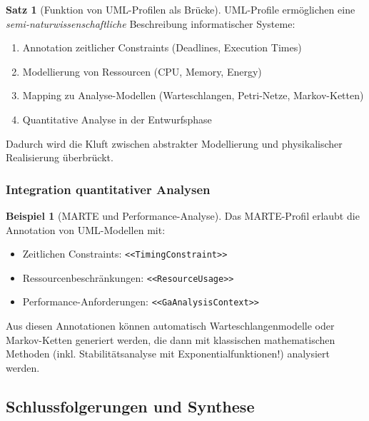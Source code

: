 ﻿\documentclass[a4paper,12pt]{scrreprt}
\theoremstyle{definition}
\newtheorem{beispiel}{Beispiel}[section]
\newtheorem{satz}{Satz}[section]
\begin{document}
\begin{satz}[Funktion von UML-Profilen als Brücke]
	UML-Profile ermöglichen eine \textit{semi-naturwissenschaftliche} Beschreibung informatischer Systeme:
	\begin{enumerate}
		\item[-] Annotation zeitlicher Constraints (Deadlines, Execution Times)
		\item[-] Modellierung von Ressourcen (CPU, Memory, Energy)
		\item[-] Mapping zu Analyse-Modellen (Warteschlangen, Petri-Netze, Markov-Ketten)
		\item[-] Quantitative Analyse in der Entwurfsphase
	\end{enumerate}
	
	Dadurch wird die Kluft zwischen abstrakter Modellierung und physikalischer Realisierung überbrückt.
\end{satz}

\subsubsection{Integration quantitativer Analysen}

\begin{beispiel}[MARTE und Performance-Analyse]
	Das MARTE-Profil erlaubt die Annotation von UML-Modellen mit:
	\begin{itemize}
		\item[-] Zeitlichen Constraints: \texttt{<<TimingConstraint>>}
		\item[-] Ressourcenbeschränkungen: \texttt{<<ResourceUsage>>}
		\item[-] Performance-Anforderungen: \texttt{<<GaAnalysisContext>>}
	\end{itemize}
	
	Aus diesen Annotationen können automatisch Warteschlangenmodelle oder Markov-Ketten generiert werden, die dann mit klassischen mathematischen Methoden (inkl. Stabilitätsanalyse mit Exponentialfunktionen!) analysiert werden.
\end{beispiel}

\subsection{Schlussfolgerungen und Synthese}
\end{document}
